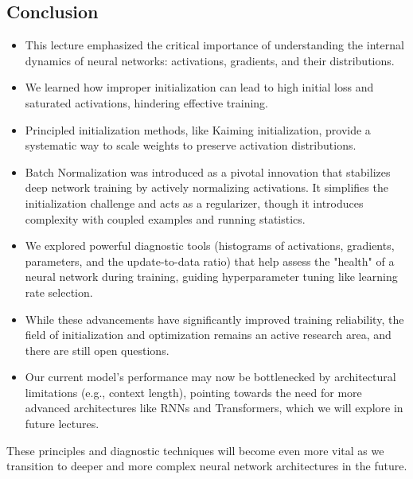 \subsection{Conclusion}
\begin{itemize}
    \item This lecture emphasized the critical importance of understanding the internal dynamics of neural networks: activations, gradients, and their distributions.
    \item We learned how improper initialization can lead to high initial loss and saturated activations, hindering effective training.
    \item Principled initialization methods, like Kaiming initialization, provide a systematic way to scale weights to preserve activation distributions.
    \item Batch Normalization was introduced as a pivotal innovation that stabilizes deep network training by actively normalizing activations. It simplifies the initialization challenge and acts as a regularizer, though it introduces complexity with coupled examples and running statistics.
    \item We explored powerful diagnostic tools (histograms of activations, gradients, parameters, and the update-to-data ratio) that help assess the "health" of a neural network during training, guiding hyperparameter tuning like learning rate selection.
    \item While these advancements have significantly improved training reliability, the field of initialization and optimization remains an active research area, and there are still open questions.
    \item Our current model's performance may now be bottlenecked by architectural limitations (e.g., context length), pointing towards the need for more advanced architectures like RNNs and Transformers, which we will explore in future lectures.
\end{itemize}

These principles and diagnostic techniques will become even more vital as we transition to deeper and more complex neural network architectures in the future.